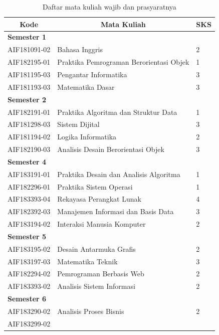 \begin{table}[H]
	\centering
		\caption{Daftar mata kuliah wajib dan prasyaratnya}
		\begin{tabular}{|p{2.85cm}|p{7.95cm}|p{1.75cm}|}
			\hline
			\multicolumn{1}{|c|}{\textbf{Kode}} & \multicolumn{1}{c|}{\textbf{Mata Kuliah}} & \multicolumn{1}{c|}{\textbf{SKS}} \\ \hline
			\multicolumn{3}{|l|}{\textbf{Semester 1}}                    \\ \hline
AIF181091-02 & Bahasa Inggris                          & 2   \\ \hline
AIF182195-01 & Praktika Pemrograman Berorientasi Objek & 1   \\ \hline
AIF181195-03 & Pengantar Informatika                   & 3   \\ \hline
AIF181193-03 & Matematika Dasar                        & 3   \\ \hline
\multicolumn{3}{|l|}{\textbf{Semester 2}}                    \\ \hline
AIF182191-01 & Praktika Algoritma dan Struktur Data    & 1   \\ \hline
AIF181298-03 & Sistem Dijital                          & 3   \\ \hline
AIF181194-02 & Logika Informatika                      & 2   \\ \hline
AIF182190-03 & Analisis Desain Berorientasi  Objek     & 3   \\ \hline
\multicolumn{3}{|l|}{\textbf{Semester 4}}                    \\ \hline
AIF183191-01 & Praktika Desain dan Analisis Algoritma  & 1   \\ \hline
AIF182296-01 & Praktika Sistem Operasi                 & 1   \\ \hline
AIF183393-04 & Rekayasa Perangkat Lunak                & 4   \\ \hline
AIF182392-03 & Manajemen Informasi dan Basis Data      & 3   \\ \hline
AIF183194-02 & Interaksi Manusia Komputer              & 2   \\ \hline
\multicolumn{3}{|l|}{\textbf{Semester 5}}                    \\ \hline
AIF183195-02 & Desain Antarmuka Grafis                 & 2   \\ \hline
AIF183197-03 & Matematika Teknik                       & 3   \\ \hline
AIF182294-02 & Pemrograman Berbasis Web                & 2   \\ \hline
AIF183393-02 & Analisis Sistem Informasi               & 2   \\ \hline
\multicolumn{3}{|l|}{\textbf{Semester 6}}                    \\ \hline
AIF183290-02 & Analisis Proses Bisnis                  & 2   \\ \hline
AIF183299-02


\end{tabular}
\end{table}
